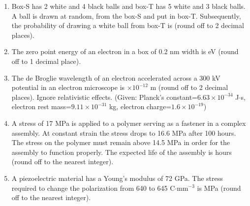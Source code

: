 \documentclass[journal,12pt,onecolumn]{IEEEtran}
\begin{document}
\begin{enumerate}
\vspace{0.5cm}

\item Box-S has 2 white and 4 black balls and box-T has 5 white and 3 black balls. A ball is drawn at random, from the box-S and put in box-T. Subsequently, the probability of drawing a white ball from box-T is \underline{\hspace{2cm}} (round off to 2 decimal places).
\hfill{} \\

\vspace{0.5cm}

\item The zero point energy of an electron in a box of 0.2 nm width is \underline{\hspace{2cm}} eV (round off to 1 decimal place).
\hfill{} \\

\vspace{0.5cm}

\item The de Broglie wavelength of an electron accelerated across a 300 kV potential in an electron microscope is \underline{\hspace{2cm}}$\times10^{-12}$ m (round off to 2 decimal places). Ignore relativistic effects. (Given: Planck's constant=$6.63\times10^{-34}$ J$\cdot$s, electron rest mass=$9.11\times10^{-31}$ kg, electron charge=$1.6\times10^{-19}$)
\hfill{} \\

\vspace{0.5cm}

\item A stress of 17 MPa is applied to a polymer serving as a fastener in a complex assembly. At constant strain the stress drops to 16.6 MPa after 100 hours. The stress on the polymer must remain above 14.5 MPa in order for the assembly to function properly. The expected life of the assembly is \underline{\hspace{2cm}} hours (round off to the nearest integer).
\hfill{} \\


\item A piezoelectric material has a Young's modulus of 72 GPa. The stress required to change the polarization from 640 to 645 C$\cdot$mm$^{-3}$ is \underline{\hspace{2cm}} MPa (round off to the nearest integer).
\hfill{} \\


\end{enumerate}
\end{document}
